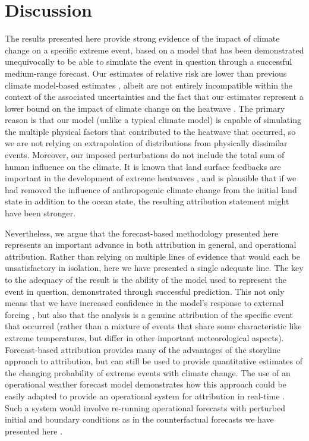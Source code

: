 \section{Discussion}\label{ch4:discussion}

  \begin{mccorrection}
    The results presented here provide strong evidence of the impact of climate change on a specific extreme event, based on a model that has been demonstrated unequivocally to be able to simulate the event in question through a successful medium-range forecast. Our estimates of relative risk are lower than previous climate model-based estimates \cite{philip_rapid_2021}, albeit are not entirely incompatible within the context of the associated uncertainties and the fact that our estimates represent a lower bound on the impact of climate change on the heatwave \cite[as was the case in][]{leach_forecast-based_2021}. The primary reason is that our model (unlike a typical climate model) is capable of simulating the multiple physical factors that contributed to the heatwave that occurred, so we are not relying on extrapolation of distributions from physically dissimilar events. Moreover, our imposed perturbations do not include the total sum of human influence on the climate. It is known that land surface feedbacks are important in the development of extreme heatwaves \cite{fischer_contribution_2007}, and is plausible that if we had removed the influence of anthropogenic climate change from the initial land state in addition to the ocean state, the resulting attribution statement might have been stronger.
  \end{mccorrection}

  Nevertheless, we argue that the forecast-based methodology presented here represents an important advance in both attribution in general, and operational attribution. Rather than relying on multiple lines of evidence that would each be unsatisfactory in isolation, here we have presented a single adequate line. The key to the adequacy of the result is the ability of the model used to represent the event in question, demonstrated through successful prediction. This not only means that we have increased confidence in the model's response to external forcing \cite{palmer_simple_2018,palmer_nonlinear_1999}, but also that the analysis is a genuine attribution of the specific event that occurred (rather than a mixture of events that share some characteristic like extreme temperatures, but differ in other important meteorological aspects). Forecast-based attribution provides many of the advantages of the storyline approach to attribution, but can still be used to provide quantitative estimates of the changing probability of extreme events with climate change. The use of an operational weather forecast model demonstrates how this approach could be easily adapted to provide an operational system for attribution in real-time \cite[or potentially even in advance,][]{wang_initialized_2021}. Such a system would involve re-running operational forecasts with perturbed initial and boundary conditions as in the counterfactual forecasts we have presented here \cite{wehner_operational_2022}.

